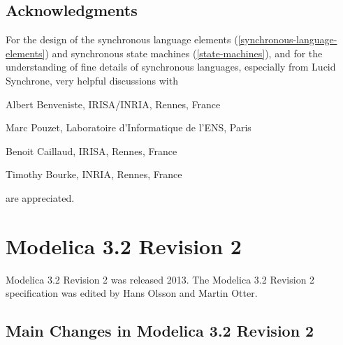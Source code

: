 \subsection{Acknowledgments}\label{acknowledgments1}

For the design of the synchronous language elements (\cref{synchronous-language-elements}) and
synchronous state machines (\cref{state-machines}), and for the understanding of
fine details of synchronous languages, especially from Lucid Synchrone,
very helpful discussions with
\begin{contributors}
\item Albert Benveniste, IRISA/INRIA, Rennes, France
\item Marc Pouzet, Laboratoire d'Informatique de l'ENS, Paris
\item Benoit Caillaud, IRISA, Rennes, France
\item Timothy Bourke, INRIA, Rennes, France
\end{contributors}
are appreciated.

\section{Modelica 3.2 Revision 2}\label{modelica-3-2-revision-2}

Modelica 3.2 Revision 2 was released 2013. The Modelica 3.2 Revision 2
specification was edited by Hans Olsson and Martin Otter.

\subsection{Main Changes in Modelica 3.2 Revision 2}\label{main-changes-in-modelica-3-2-revision-2}


